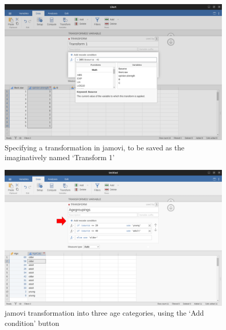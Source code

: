 \documentclass[
  a4paper,
]{book}
\begin{document}
\begin{figure}

\includegraphics[width=1\textwidth,height=\textheight]{images/fig6-8.png} \hfill{}

\caption{\label{fig-fig6-8}Specifying a transformation in jamovi, to be
saved as the imaginatively named `Transform 1'}

\end{figure}

\begin{figure}

\includegraphics[width=1\textwidth,height=\textheight]{images/fig6-9.png} \hfill{}

\caption{\label{fig-fig6-9}jamovi transformation into three age
categories, using the `Add condition' button}

\end{figure}

\hypertarget{tbl-tab6-5}{}
 
  \providecommand{\huxb}[2]{\arrayrulecolor[RGB]{#1}\global\arrayrulewidth=#2pt}
  \providecommand{\huxvb}[2]{\color[RGB]{#1}\vrule width #2pt}
  \providecommand{\huxtpad}[1]{\rule{0pt}{#1}}
  \providecommand{\huxbpad}[1]{\rule[-#1]{0pt}{#1}}
\end{document}
